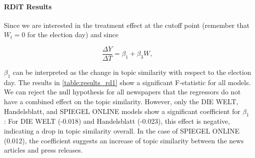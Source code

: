 \documentclass[
  12pt,
]{article}
\begin{document}
\hypertarget{rdit-results}{%
\paragraph{RDiT Results}\label{rdit-results}}

Since we are interested in the treatment effect at the cutoff point
(remember that \(W_t=0\) for the election day) and since

\[
\frac{\Delta Y}{\Delta T}=\beta_1+\beta_3W,
\]

\(\beta_1\) can be interpreted as the change in topic similarity with
respect to the election day. The results in \autoref{table:results_rd1}
show a significant F-statistic for all models. We can reject the null
hypothesis for all newspapers that the regressors do not have a combined
effect on the topic similarity. However, only the DIE WELT,
Handelsblatt, and SPIEGEL ONLINE models show a significant coefficient
for \(\beta_1\): For DIE WELT (-0.018) and Handelsblatt (-0.023), this
effect is negative, indicating a drop in topic similarity overall. In
the case of SPIEGEL ONLINE (0.012), the coefficient suggests an increase
of topic similarity between the news articles and press releases.
\end{document}

